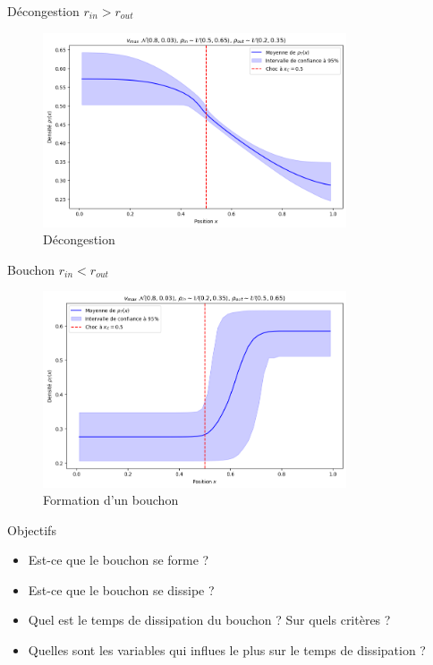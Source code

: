 \documentclass[10pt]{beamer}
\begin{document}
\begin{frame}{Décongestion}
  $r_{in} > r_{out}$ \\
  \begin{figure}
    \centering
    \includegraphics[width=0.8\textwidth]{images/rin_greater_rout.png}
    \caption{Décongestion}
  \end{figure}
\end{frame}

\begin{frame}{Bouchon}
  $r_{in} < r_{out}$ \\
  \begin{figure}
    \centering
    \includegraphics[width=0.8\textwidth]{images/rin_less_rout.png}
    \caption{Formation d'un bouchon}
  \end{figure}
\end{frame}

\begin{frame}{Objectifs}
  \begin{itemize}
    \item Est-ce que le bouchon se forme ?
    \item Est-ce que le bouchon se dissipe ?
    \item Quel est le temps de dissipation du bouchon ? Sur quels critères ?
    \item Quelles sont les variables qui influes le plus sur le temps de dissipation ?
  \end{itemize}
\end{frame}
\end{document}
